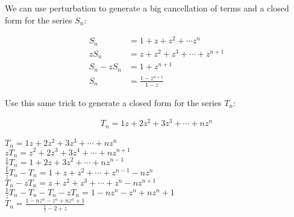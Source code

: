 \documentclass[solution,letterpaper]{cs20}
\begin{document}
    \begin{problem}
        We can use perturbation to generate a big cancellation of terms and a closed form for the series $S_n$:

        \begin{align*}
            S_n &= 1 + z + z^2 + \cdots z^n \\
            zS_n &= z + z^2 + z^3 + \cdots + z^{n+1} \\
            S_n - zS_n &= 1 + z^{n+1} \\
            S_n &= \frac{1 - z^{n+1}}{1 - z}
        \end{align*}

        Use this same trick to generate a closed form for the series $T_n$:

        \begin{align*}
            T_n = 1z + 2z^2 + 3z^3 + \cdots + nz^n
        \end{align*}

        \begin{solution}
            $ T_n = 1z + 2z^2 + 3z^3 + \cdots + nz^n$ \\
            $ zT_n = z^2 + 2z^3 + 3z^4 + \cdots + nz^{n+1}$ \\
            $ \frac{1}{z}T_n = 1 + 2z + 3z^2 + \cdots + nz^{n-1}$ \\
            $ \frac{1}{z}T_n - T_n = 1 + z + z^2 + \cdots + z^{n-1} - nz^n$ \\
            $T_n - zT_n = z + z^2 + z^3 + \cdots + z^n - nz^{n+1}$ \\
            $\frac{1}{z}T_n - T_n - T_n - zT_n = 1 - nz^n - z^n + nz^n+1$ \\
            $T_n = \frac{1 - nz^n - z^n + nz^n+1}{\frac{1}{z} - 2 + z}$ \\
        \end{solution}
    \end{problem}
    \newpage
\end{document}

